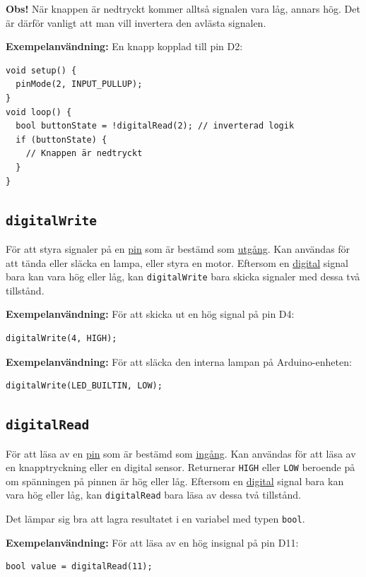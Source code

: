 \documentclass[11pt]{article}
\begin{document}
\textbf{Obs!} När knappen är nedtryckt kommer alltså signalen vara låg, annars
hög. Det är därför vanligt att man vill invertera den avlästa signalen.

\textbf{Exempelanvändning:}
En knapp kopplad till pin D2:
\begin{lstlisting}
void setup() {
  pinMode(2, INPUT_PULLUP);
}
void loop() {
  bool buttonState = !digitalRead(2); // inverterad logik
  if (buttonState) {
    // Knappen är nedtryckt
  }
}
\end{lstlisting}

\subsection{\texttt{digitalWrite}}
För att styra signaler på en \hyperref[sec:pin]{pin} som är bestämd som
\hyperref[sec:io]{utgång}. Kan användas för att tända eller släcka en lampa,
eller styra en motor. Eftersom en \hyperref[sec:analog-digital]{digital} signal
bara kan vara hög eller låg, kan \texttt{digitalWrite} bara skicka signaler med
dessa två tillstånd.

\textbf{Exempelanvändning:}
För att skicka ut en hög signal på pin D4:
\begin{lstlisting}
digitalWrite(4, HIGH);
\end{lstlisting}

\textbf{Exempelanvändning:}
För att släcka den interna lampan på Arduino-enheten:
\begin{lstlisting}
digitalWrite(LED_BUILTIN, LOW);
\end{lstlisting}

\subsection{\texttt{digitalRead}}
För att läsa av en \hyperref[sec:pin]{pin} som är bestämd som
\hyperref[sec:io]{ingång}. Kan användas för att läsa av en knapptryckning eller
en digital sensor. Returnerar \texttt{HIGH} eller \texttt{LOW} beroende på om
spänningen på pinnen är hög eller låg. Eftersom en
\hyperref[sec:analog-digital]{digital} signal bara kan vara hög eller låg, kan
\texttt{digitalRead} bara läsa av dessa två tillstånd.

Det lämpar sig bra att lagra resultatet i en variabel med typen \texttt{bool}.

\textbf{Exempelanvändning:}
För att läsa av en hög insignal på pin D11:
\begin{lstlisting}
bool value = digitalRead(11);
\end{lstlisting}
\end{document}
